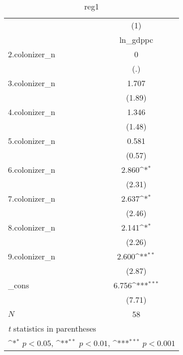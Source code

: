 \begin{table}[htbp]\centering
\def\sym#1{\ifmmode^{#1}\else\(^{#1}\)\fi}
\caption{reg1}
\begin{tabular}{l*{1}{c}}
\hline\hline
            &\multicolumn{1}{c}{(1)}\\
            &\multicolumn{1}{c}{ln\_gdppc}\\
\hline
2.colonizer\_n&           0         \\
            &         (.)         \\
[1em]
3.colonizer\_n&       1.707         \\
            &      (1.89)         \\
[1em]
4.colonizer\_n&       1.346         \\
            &      (1.48)         \\
[1em]
5.colonizer\_n&       0.581         \\
            &      (0.57)         \\
[1em]
6.colonizer\_n&       2.860\sym{*}  \\
            &      (2.31)         \\
[1em]
7.colonizer\_n&       2.637\sym{*}  \\
            &      (2.46)         \\
[1em]
8.colonizer\_n&       2.141\sym{*}  \\
            &      (2.26)         \\
[1em]
9.colonizer\_n&       2.600\sym{**} \\
            &      (2.87)         \\
[1em]
\_cons      &       6.756\sym{***}\\
            &      (7.71)         \\
\hline
\(N\)       &          58         \\
\hline\hline
\multicolumn{2}{l}{\footnotesize \textit{t} statistics in parentheses}\\
\multicolumn{2}{l}{\footnotesize \sym{*} \(p<0.05\), \sym{**} \(p<0.01\), \sym{***} \(p<0.001\)}\\
\end{tabular}
\end{table}
